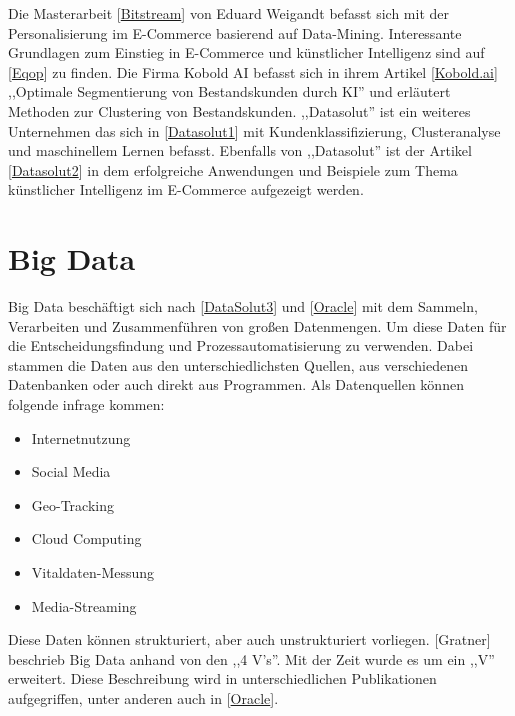 Die Masterarbeit [\href{https://reposit.haw-hamburg.de/bitstream/20.500.12738/7932/1/master_thesis.pdf}{Bitstream}] von Eduard Weigandt befasst sich mit der Personalisierung im E-Commerce basierend auf Data-Mining. Interessante Grundlagen zum Einstieg in E-Commerce und künstlicher Intelligenz sind auf [\href{https://www.epoq.de/blog}{Eqop}] zu finden. Die Firma Kobold AI befasst sich in ihrem Artikel [\href{https://www.kobold.ai/kundensegmentierung-ki}{Kobold.ai}] ,,Optimale Segmentierung von Bestandskunden durch KI'' und erläutert Methoden zur Clustering von Bestandskunden. ,,Datasolut'' ist ein weiteres Unternehmen das sich in [\href{https://datasolut.com/kundenklassifizierung-definition-vorteile-und-methoden}{Datasolut1}] mit Kundenklassifizierung, Clusteranalyse und maschinellem Lernen befasst. Ebenfalls von ,,Datasolut'' ist der Artikel [\href{https://datasolut.com/ki-im-e-commerce}{Datasolut2}] in dem erfolgreiche Anwendungen und Beispiele zum Thema künstlicher Intelligenz im E-Commerce aufgezeigt werden.

\section{Big Data}
Big Data beschäftigt sich nach [\href{https://datasolut.com/was-ist-big-data}{DataSolut3}] und [\href{https://www.oracle.com/de/big-data/what-is-big-data}{Oracle}] mit dem Sammeln, Verarbeiten und Zusammenführen von großen Datenmengen. Um diese Daten für die Entscheidungsfindung und Prozessautomatisierung zu verwenden. Dabei stammen die Daten aus den unterschiedlichsten Quellen, aus verschiedenen Datenbanken oder auch direkt aus Programmen. Als Datenquellen können folgende infrage kommen:

\begin{itemize}
	\item Internetnutzung
	\item Social Media
	\item Geo-Tracking
	\item Cloud Computing
	\item Vitaldaten-Messung
	\item Media-Streaming
\end{itemize}

Diese Daten können strukturiert, aber auch unstrukturiert vorliegen. [Gratner] beschrieb Big Data anhand von den ,,4 V's''. Mit der Zeit wurde es um ein ,,V'' erweitert. Diese Beschreibung wird in unterschiedlichen Publikationen aufgegriffen, unter anderen auch in [\href{https://www.oracle.com/de/big-data/what-is-big-data}{Oracle}].\vspace{0.5cm}

